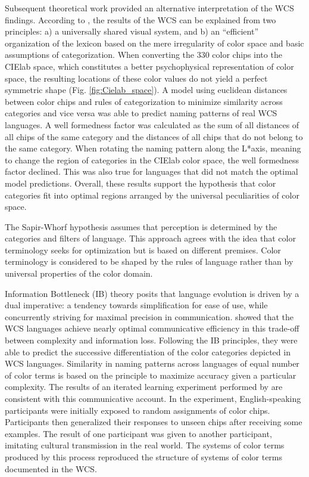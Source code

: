 Subsequent theoretical work provided an alternative interpretation of the WCS findings. According to \textcite{regierColor2007}, the results of the WCS can be explained from two principles: a) a universally shared visual system, and b) an ``efficient'' organization of the lexicon based on the mere irregularity of color space and basic assumptions of categorization.
When converting the 330 color chips into the CIElab space, which constitutes a better psychophysical representation of color space, the resulting locations of these color values do not yield a perfect symmetric shape (Fig. \ref{fig:Cielab_space}).
A model using euclidean distances between color chips and rules of categorization to minimize similarity across categories and vice versa was able to predict naming patterns of real WCS languages.
A well formedness factor was calculated as the sum of all distances of all chips of the same category and the distances of all chips that do not belong to the same category.
When rotating the naming pattern along the L*axis, meaning to change the region of categories in the CIElab color space, the well formedness factor declined.
This was also true for languages that did not match the optimal model predictions.
Overall, these results support the hypothesis that color categories fit into optimal regions arranged by the universal peculiarities of color space.



The Sapir-Whorf hypothesis assumes that perception is determined by the categories and filters of language. This approach agrees with the idea that color terminology seeks for optimization but is based on different premises. Color terminology is considered to be shaped by the rules of language rather than by universal properties of the color domain.

Information Bottleneck (IB) theory posits that language evolution is driven by a dual imperative: a tendency towards simplification for ease of use, while concurrently striving for maximal precision in communication.
\textcite{zaslavskyEfficient2018} showed that the WCS languages achieve nearly optimal communicative efficiency in this trade-off between complexity and information loss.
Following the IB principles, they were able to predict the successive differentiation of the color categories depicted in WCS languages. 
Similarity in naming patterns across languages of equal number of color terms is based on the principle to maximize accuracy given a particular complexity.
The results of an iterated learning experiment performed by \textcite{xuCultural2013} are consistent with this communicative account. In the experiment, English-speaking participants were initially exposed to random assignments of color chips. Participants then generalized their responses to unseen chips after receiving some examples. The result of one participant was given to another participant, imitating cultural transmission in the real world. The systems of color terms produced by this process reproduced the structure of systems of color terms documented in the WCS.


